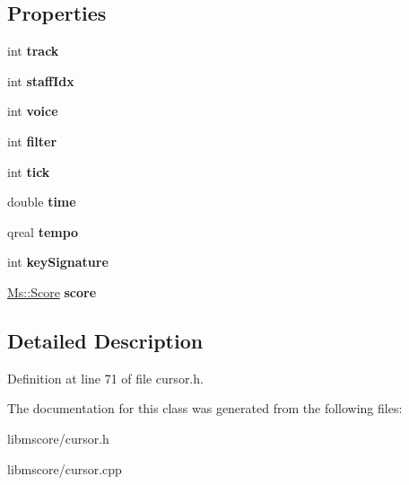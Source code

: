 \subsection*{Properties}
\begin{DoxyCompactItemize}
\item 
\mbox{\label{class_ms_1_1_cursor_a41a0063953183e45c2c8f199a0bfe359}} 
int {\bfseries track}
\item 
\mbox{\label{class_ms_1_1_cursor_a44462fb2f9c39f9d9abb7b3e7dd8ffba}} 
int {\bfseries staff\+Idx}
\item 
\mbox{\label{class_ms_1_1_cursor_ad64f1de48f3ab3c31d7055a87c43f3a4}} 
int {\bfseries voice}
\item 
\mbox{\label{class_ms_1_1_cursor_a7f415eac5745941b0910f03034bbec5e}} 
int {\bfseries filter}
\item 
\mbox{\label{class_ms_1_1_cursor_a2349da74502d61307e0544ebe45de46c}} 
int {\bfseries tick}
\item 
\mbox{\label{class_ms_1_1_cursor_ad656e8dec4a65579c96759bf1356e136}} 
double {\bfseries time}
\item 
\mbox{\label{class_ms_1_1_cursor_a34490ea14a71298229c7076ebb54c5ae}} 
qreal {\bfseries tempo}
\item 
\mbox{\label{class_ms_1_1_cursor_a55a9454e653e51f06c62620cb6ef8b54}} 
int {\bfseries key\+Signature}
\item 
\mbox{\label{class_ms_1_1_cursor_a71f21dc03d10622a127471a48bd07f06}} 
\hyperlink{class_ms_1_1_score}{Ms\+::\+Score} {\bfseries score}
\end{DoxyCompactItemize}


\subsection{Detailed Description}


Definition at line 71 of file cursor.\+h.



The documentation for this class was generated from the following files\+:\begin{DoxyCompactItemize}
\item 
libmscore/cursor.\+h\item 
libmscore/cursor.\+cpp\end{DoxyCompactItemize}
